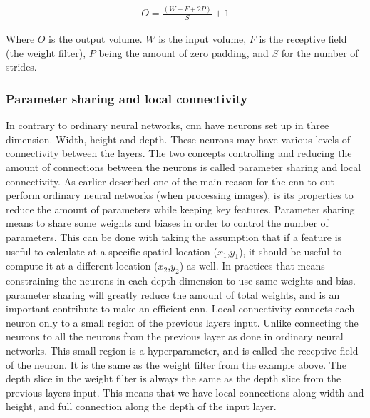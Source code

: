 \documentclass[USenglish]{ifimaster}  %
\begin{document}
\begin{equation}\label{eq:output_conv}
\begin{aligned}
O = \frac{(W - F + 2P)}{S}+1
\end{aligned}
\end{equation}

Where $O$ is the output volume. $W$ is the input volume, $F$ is the receptive field (the weight filter), $P$ being the amount of zero padding, and $S$ for the number of strides.
 
\subsubsection{Parameter sharing and local connectivity}
In contrary to ordinary neural networks, \ac{cnn} have neurons set up in three dimension. Width, height and depth. These neurons may have various levels of connectivity between the layers. The two concepts controlling and reducing the amount of connections between the neurons is called parameter sharing and local connectivity. As earlier described one of the main reason for the \ac{cnn} to out perform ordinary neural networks (when processing images), is its properties to reduce the amount of parameters while keeping key features. 
\newline
\newline
Parameter sharing means to share some weights and biases in order to control the number of parameters. This can be done with taking the assumption that if a feature is useful to calculate at a specific spatial location ($x_1$,$y_1$), it should be useful to compute it at a different location ($x_2$,$y_2$) as well. In practices that means constraining the neurons in each depth dimension to use same weights and bias. parameter sharing will greatly reduce the amount of total weights, and is an important contribute to make an efficient \ac{cnn}. 
\newline
\newline
Local connectivity connects each neuron only to a small region of the previous layers input. Unlike connecting the neurons to all the neurons from the previous layer as done in ordinary neural networks.
This small region is a hyperparameter, and is called the receptive field of the neuron. It is the same as the weight filter from the example above. The depth slice in the weight filter is always the same as the depth slice from the previous layers input. This means that we have local connections along width and height, and full connection along the depth of the input layer.
\end{document}

